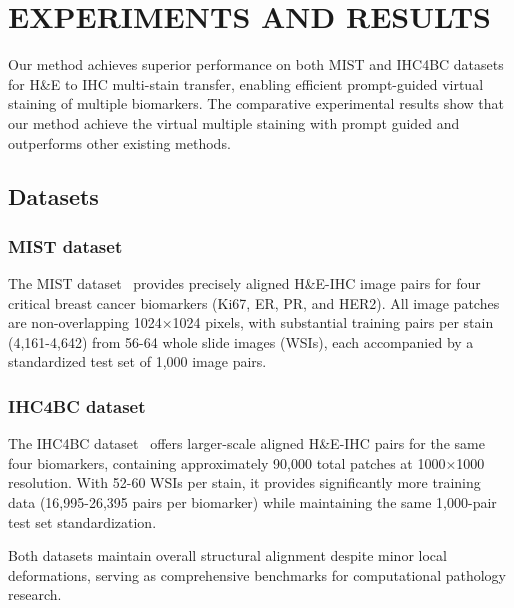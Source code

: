 \documentclass[journal,twoside,web]{ieeecolor}
\begin{document}
\section{ EXPERIMENTS AND RESULTS}

Our method achieves superior performance on both MIST and IHC4BC datasets for H\&E to IHC multi-stain transfer, enabling efficient prompt-guided virtual staining of multiple biomarkers.
The comparative experimental results show that our method achieve the virtual multiple staining with prompt guided and outperforms other existing methods.
\subsection{Datasets}
\subsubsection{MIST dataset} The MIST dataset~\cite{li2023adaptive} provides precisely aligned H\&E-IHC image pairs for four critical breast cancer biomarkers (Ki67, ER, PR, and HER2). All image patches are non-overlapping 1024×1024 pixels, with substantial training pairs per stain (4,161-4,642) from 56-64 whole slide images (WSIs), each accompanied by a standardized test set of 1,000 image pairs.
\subsubsection{IHC4BC dataset} The IHC4BC dataset~\cite{akbarnejad2023predicting} offers larger-scale aligned H\&E-IHC pairs for the same four biomarkers, containing approximately 90,000 total patches at 1000×1000 resolution. With 52-60 WSIs per stain, it provides significantly more training data (16,995-26,395 pairs per biomarker) while maintaining the same 1,000-pair test set standardization. 

Both datasets maintain overall structural alignment despite minor local deformations, serving as comprehensive benchmarks for computational pathology research.



\end{document}

